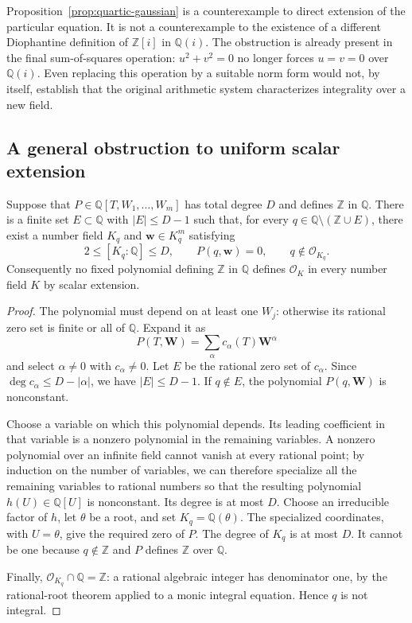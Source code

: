 \begin{remark}
Proposition~\ref{prop:quartic-gaussian} is a counterexample to direct
extension of the particular equation.  It is not a counterexample to
the existence of a different Diophantine definition of
$\mathbb Z[i]$ in $\mathbb Q(i)$.
The obstruction is already present in the final sum-of-squares operation:
$u^2+v^2=0$ no longer forces $u=v=0$ over $\mathbb Q(i)$.
Even replacing this operation by a suitable norm form would not, by
itself, establish that the original arithmetic system characterizes
integrality over a new field.
\end{remark}

\subsection{A general obstruction to uniform scalar extension}

\begin{proposition}\label{prop:bounded-extension-false-positive}
Suppose that $P\in\mathbb Q[T,W_1,\ldots,W_m]$ has total degree $D$ and
defines $\mathbb Z$ in $\mathbb Q$.  There is a finite set
$E\subset\mathbb Q$ with $|E|\leq D-1$ such that, for every
$q\in\mathbb Q\setminus(\mathbb Z\cup E)$, there exist a number field
$K_q$ and $\mathbf w\in K_q^m$ satisfying
\[
 2\leq[K_q:\mathbb Q]\leq D,\qquad P(q,\mathbf w)=0,
 \qquad q\notin\mathcal O_{K_q}.
\]
Consequently no fixed polynomial defining $\mathbb Z$ in $\mathbb Q$
defines $\mathcal O_K$ in every number field $K$ by scalar extension.
\end{proposition}
\begin{proof}
The polynomial must depend on at least one $W_j$: otherwise its rational
zero set is finite or all of $\mathbb Q$.  Expand it as
\[
 P(T,\mathbf W)=\sum_{\alpha}c_{\alpha}(T)\mathbf W^{\alpha}
\]
and select $\alpha\ne0$ with $c_{\alpha}\ne0$.  Let $E$ be the rational
zero set of $c_{\alpha}$.  Since $\deg c_{\alpha}\leq D-|\alpha|$,
we have $|E|\leq D-1$.  If $q\notin E$, the polynomial
$P(q,\mathbf W)$ is nonconstant.

Choose a variable on which this polynomial depends.  Its leading
coefficient in that variable is a nonzero polynomial in the remaining
variables.  A nonzero polynomial over an infinite field cannot vanish
at every rational point; by induction on the number of variables,
we can therefore specialize all the remaining variables to rational
numbers so that the resulting polynomial $h(U)\in\mathbb Q[U]$ is
nonconstant.  Its degree is at most $D$.
Choose an irreducible factor of $h$, let $\theta$ be a root, and set
$K_q=\mathbb Q(\theta)$.  The specialized coordinates, with $U=\theta$,
give the required zero of $P$.  The degree of $K_q$ is at most $D$.
It cannot be one because $q\notin\mathbb Z$ and $P$ defines
$\mathbb Z$ over $\mathbb Q$.

Finally, $\mathcal O_{K_q}\cap\mathbb Q=\mathbb Z$: a rational
algebraic integer has denominator one, by the rational-root theorem
applied to a monic integral equation.  Hence $q$ is not integral.
\end{proof}

